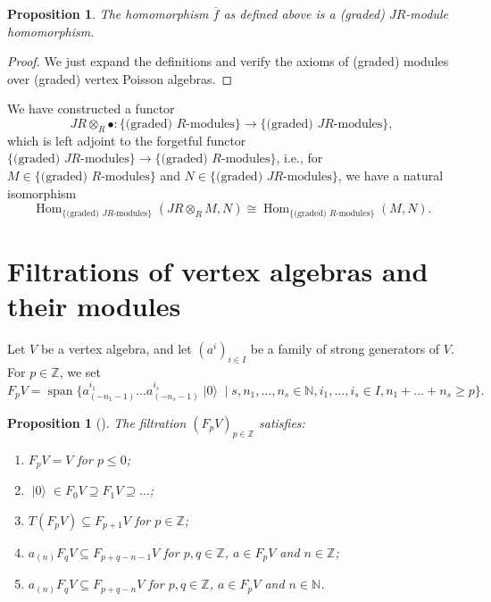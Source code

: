 \documentclass[a4paper, 12pt, reqno]{amsart}
\newtheorem{proposition}[theorem]{Proposition}
\theoremstyle{remark}
\DeclareMathOperator{\vac}{|0\rangle}
\DeclareMathOperator{\Hom}{Hom}
\DeclareMathOperator{\vspan}{span}
\begin{document}
\begin{proposition}
  \label{prp:5}
  The homomorphism $\overline{f}$ as defined above is a (graded) $JR$-module homomorphism.
\end{proposition}

\begin{proof}
  We just expand the definitions and verify the axioms of (graded) modules over (graded) vertex Poisson algebras.
\end{proof}

We have constructed a functor
\begin{equation*}
  JR \otimes_R \bullet: \{\text{(graded) $R$-modules}\} \to \{\text{(graded) $JR$-modules}\},
\end{equation*}
which is left adjoint to the forgetful functor $\{\text{(graded) $JR$-modules}\} \to \{\text{(graded) $R$-modules}\}$, i.e., for $M \in \{\text{(graded) $R$-modules}\}$ and $N \in \{\text{(graded) $JR$-modules}\}$, we have a natural isomorphism
\begin{equation*}
  \Hom_{\{\text{(graded) $JR$-modules}\}}(JR \otimes_R M, N) \cong \Hom_{\{\text{(graded) $R$-modules}\}}(M, N).
\end{equation*}

\section{Filtrations of vertex algebras and their modules}
\label{sec:filtr-vert-algebr}

Let $V$ be a vertex algebra, and let $(a^i)_{i \in I}$ be a family of strong generators of $V$.
For $p \in \mathbb{Z}$, we set
\begin{equation*}
  F_pV = \vspan\{a^{i_1}_{(-n_1 - 1)}\dots a^{i_s}_{(-n_s - 1)}\vac \mid s, n_1, \dots, n_s \in \mathbb{N}, i_1, \dots, i_s \in I, n_1 + \dots + n_s \ge p\}.
\end{equation*}

\begin{proposition}[{\cite{li_abelianizing_2005}}]
  \label{prp:6}
  The filtration $(F_pV)_{p \in \mathbb{Z}}$ satisfies:
  \begin{enumerate}
  \item $F_pV = V$ for $p \le 0$;
  \item $\vac \in F_0V \supseteq F_1V \supseteq \dots$;
  \item $T(F_pV) \subseteq F_{p + 1}V$ for $p \in \mathbb{Z}$;
  \item $a_{(n)}F_qV \subseteq F_{p + q - n - 1}V$ for $p, q \in \mathbb{Z}$, $a \in F_pV$ and $n \in \mathbb{Z}$;
  \item $a_{(n)}F_qV \subseteq F_{p + q - n}V$ for $p, q \in \mathbb{Z}$, $a \in F_pV$ and $n \in \mathbb{N}$.
  \end{enumerate}
\end{proposition}
\end{document}
